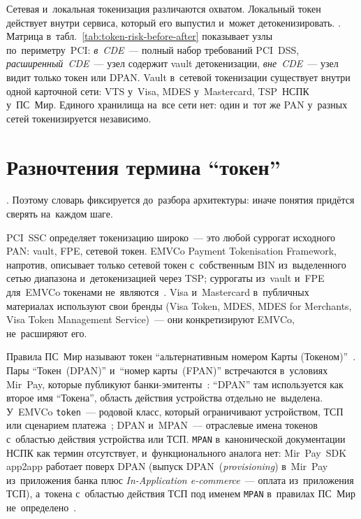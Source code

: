 Сетевая и~локальная токенизация различаются охватом. Локальный токен действует
внутри сервиса, который его выпустил и~может детокенизировать.
. Матрица в~табл.~\ref{tab:token-risk-before-after}
показывает узлы по~периметру~PCI: \textit{в~CDE}~--- полный набор требований
PCI~DSS, \textit{расширенный~CDE}~--- узел содержит vault детокенизации,
\textit{вне~CDE}~--- узел видит только токен или DPAN. Vault в~сетевой
токенизации существует внутри одной карточной сети: VTS у~Visa, MDES
у~Mastercard, TSP~НСПК у~ПС~Мир. Единого хранилища на~все сети нет: один и~тот
же PAN у~разных сетей токенизируется независимо.

\section{Разночтения термина \enquote{токен}}\label{sec:token-terminology}

. Поэтому словарь фиксируется
до~разбора архитектуры: иначе понятия придётся сверять на~каждом шаге.

PCI~SSC определяет токенизацию широко~--- это любой суррогат исходного PAN:
vault, FPE, сетевой токен. EMVCo Payment Tokenisation Framework, напротив,
описывает только сетевой токен с~собственным BIN из~выделенного сетью диапазона
и~детокенизацией через TSP; суррогаты из~vault и~FPE для~EMVCo токенами
не~являются~\cite{emvco-payment-tokenisation,pci-tokenization-guidelines}. Visa
и~Mastercard в~публичных материалах используют свои бренды (Visa Token, MDES,
MDES for Merchants, Visa Token Management Service)~--- они конкретизируют
EMVCo, не~расширяют его.

Правила ПС~Мир называют токен \enquote{альтернативным номером Карты
(Токеном)}~\cite{nspk-mir-rules-v43}. Пары \enquote{Токен~(DPAN)}
и~\enquote{номер карты~(FPAN)} встречаются в~условиях Mir~Pay, которые
публикуют банки-эмитенты~\cite{databank-mirpay-terms}: \enquote{DPAN} там
используется как второе имя \enquote{Токена}, область действия устройства
отдельно не~выделена. У~EMVCo \texttt{token}~--- родовой класс, который
ограничивают устройством, ТСП или сценарием
платежа~\cite{emvco-payment-tokenisation}; DPAN и~MPAN~--- отраслевые имена
токенов с~областью действия устройства или ТСП. \texttt{MPAN}
в~канонической документации НСПК как термин отсутствует, и~функционального
аналога нет: Mir~Pay~SDK app2app работает поверх DPAN (выпуск
  DPAN~(\textit{provisioning}) в~Mir~Pay из~приложения банка плюс
\textit{In-Application e-commerce}~--- оплата из~приложения ТСП), а~токена
с~областью действия ТСП под именем \texttt{MPAN} в~правилах ПС~Мир
не~определено~\cite{nspk-tsp}.

